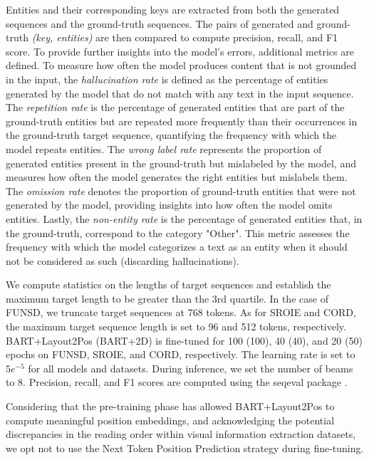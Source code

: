Entities and their corresponding keys are extracted from both the generated sequences and the ground-truth sequences. The pairs of generated and ground-truth \textit{(key, entities)} are then compared to compute precision, recall, and F1 score. To provide further insights into the model's errors, additional metrics are defined. To measure how often the model produces content that is not grounded in the input, the \textit{hallucination rate} is defined as the percentage of entities generated by the model that do not match with any text in the input sequence. The \textit{repetition rate} is the percentage of generated entities that are part of the ground-truth entities but are repeated more frequently than their occurrences in the ground-truth target sequence, quantifying the frequency with which the model repeats entities. The \textit{wrong label rate} represents the proportion of generated entities present in the ground-truth but mislabeled by the model, and measures how often the model generates the right entities but mislabels them. The \textit{omission rate} denotes the proportion of ground-truth entities that were not generated by the model, providing insights into how often the model omits entities. Lastly, the \textit{non-entity rate} is the percentage of generated entities that, in the ground-truth, correspond to the category "Other". This metric assesses the frequency with which the model categorizes a text as an entity when it should not be considered as such (discarding hallucinations).



We compute statistics on the lengths of target sequences and establish the maximum target length to be greater than the 3rd quartile. In the case of FUNSD, we truncate target sequences at 768 tokens. As for SROIE and CORD, the maximum target sequence length is set to 96 and 512 tokens, respectively. BART+Layout2Pos (BART+2D) is fine-tuned for 100 (100), 40 (40), and 20 (50) epochs on FUNSD, SROIE, and CORD, respectively. The learning rate is set to $5e^{-5}$ for all models and datasets. During inference, we set the number of beams to 8. Precision, recall, and F1 scores are computed using the seqeval package \citep{seqeval}. 

Considering that the pre-training phase has allowed BART+Layout2Pos to compute meaningful position embeddings, and acknowledging the potential discrepancies in the reading order within visual information extraction datasets, we opt not to use the Next Token Position Prediction strategy during fine-tuning.

